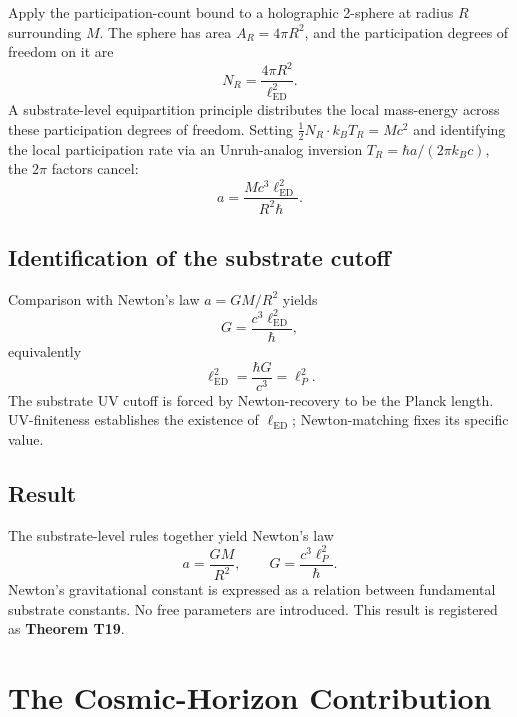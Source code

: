 \documentclass[11pt,a4paper]{article}
\begin{document}
Apply the participation-count bound to a holographic 2-sphere at radius $R$ surrounding $M$. The sphere has area $A_R = 4\pi R^2$, and the participation degrees of freedom on it are
\begin{equation}
N_R = \frac{4\pi R^2}{\ell_{\mathrm{ED}}^2}.
\end{equation}
A substrate-level equipartition principle distributes the local mass-energy across these participation degrees of freedom. Setting $\tfrac{1}{2} N_R \cdot k_B T_R = M c^2$ and identifying the local participation rate via an Unruh-analog inversion $T_R = \hbar a / (2\pi k_B c)$, the $2\pi$ factors cancel:
\begin{equation}
a = \frac{M c^3 \ell_{\mathrm{ED}}^2}{R^2 \hbar}.
\end{equation}

\subsection{Identification of the substrate cutoff}

Comparison with Newton's law $a = GM/R^2$ yields
\begin{equation}
G = \frac{c^3 \ell_{\mathrm{ED}}^2}{\hbar},
\end{equation}
equivalently
\begin{equation}
\boxed{\;\ell_{\mathrm{ED}}^2 = \frac{\hbar G}{c^3} = \ell_P^2.\;}
\end{equation}
The substrate UV cutoff is forced by Newton-recovery to be the Planck length. UV-finiteness establishes the existence of $\ell_{\mathrm{ED}}$; Newton-matching fixes its specific value.

\subsection{Result}

The substrate-level rules together yield Newton's law
\begin{equation}
a = \frac{GM}{R^2}, \qquad G = \frac{c^3 \ell_P^2}{\hbar}.
\end{equation}
Newton's gravitational constant is expressed as a relation between fundamental substrate constants. No free parameters are introduced. This result is registered as \textbf{Theorem T19}.

\section{The Cosmic-Horizon Contribution}\label{sec:cosmic}
\end{document}
